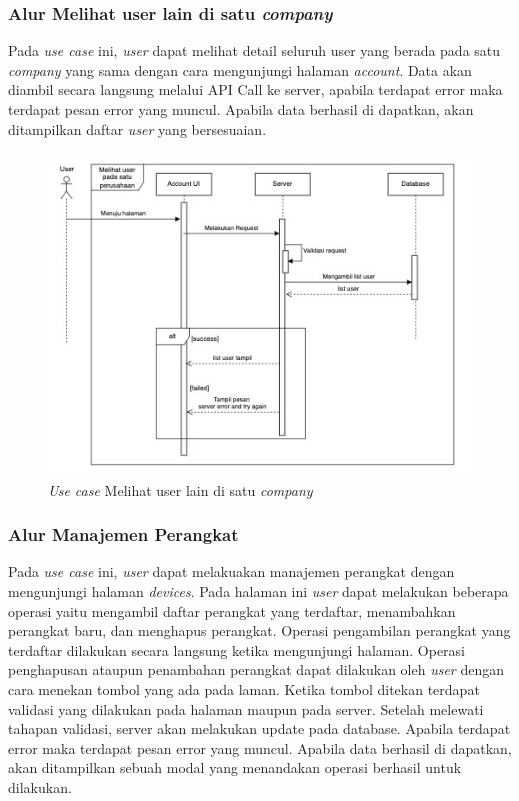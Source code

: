 \pagebreak

\subsubsection{Alur Melihat user lain di satu \textit{company}}

Pada \textit{use case} ini, \textit{user} dapat melihat detail seluruh user yang berada pada satu \textit{company} yang sama dengan cara mengunjungi halaman \textit{account}. Data akan diambil secara langsung melalui API Call ke server, apabila terdapat error maka terdapat pesan error yang muncul. Apabila data berhasil di dapatkan, akan ditampilkan daftar \textit{user} yang bersesuaian.

\begin{figure}[ht]
  \centering
  \includegraphics[width=1\textwidth]{resources/chapter-3/usecase/uc-07.jpg}
  \caption{\textit{Use case} Melihat user lain di satu \textit{company}}
  \label{fig:usecase-07}
\end{figure}

\pagebreak

\subsubsection{Alur Manajemen Perangkat}

Pada \textit{use case} ini, \textit{user} dapat melakuakan manajemen perangkat dengan mengunjungi halaman \textit{devices}. Pada halaman ini \textit{user} dapat melakukan beberapa operasi yaitu mengambil daftar perangkat yang terdaftar, menambahkan perangkat baru, dan menghapus perangkat. Operasi pengambilan perangkat yang terdaftar dilakukan secara langsung ketika mengunjungi halaman. Operasi penghapusan ataupun penambahan perangkat dapat dilakukan oleh \textit{user} dengan cara menekan tombol yang ada pada laman. Ketika tombol ditekan terdapat validasi yang dilakukan pada halaman maupun pada server. Setelah melewati tahapan validasi, server akan melakukan update pada database. Apabila terdapat error maka terdapat pesan error yang muncul. Apabila data berhasil di dapatkan, akan ditampilkan sebuah modal yang menandakan operasi berhasil untuk dilakukan.

